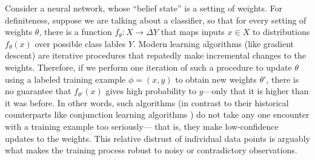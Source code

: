 \begin{example}\label{ex:classifier}
Consider a neural network, whose ``belief state'' is a setting of weights.
For definiteness, suppose we are talking about a classifier, so that for every setting of weights $\theta$, there is a function
$f_\theta : X \to \Delta Y$ that maps inputs $x \in X$ to distributions $f_\theta(x)$ over possible class lables $Y$. 
Modern learning algorithms (like gradient descent) 
are iterative procedures that 
repatedly make incremental changes to the weights.
Therefore, if we perform one iteration of such a procedure to update $\theta$ using a labeled training example $\phi = (x,y)$ to obtain new weights $\theta'$, there is no guarantee that $f_{\theta'}(x)$ gives high probability to $y$---only that it is higher than it was before.
In other words, such algorithms 
(in contrast to their historical counterparts like conjunction learning algorithms \parencite{conjunctions}) 
do not take any one encounter with a training example too seriously---
\unskip that is, they make low-confidence updates to the weights. 
This relative distrust of 
individual data points
is arguably what makes the training process robust to noisy or contradictory observations.


\end{example}
